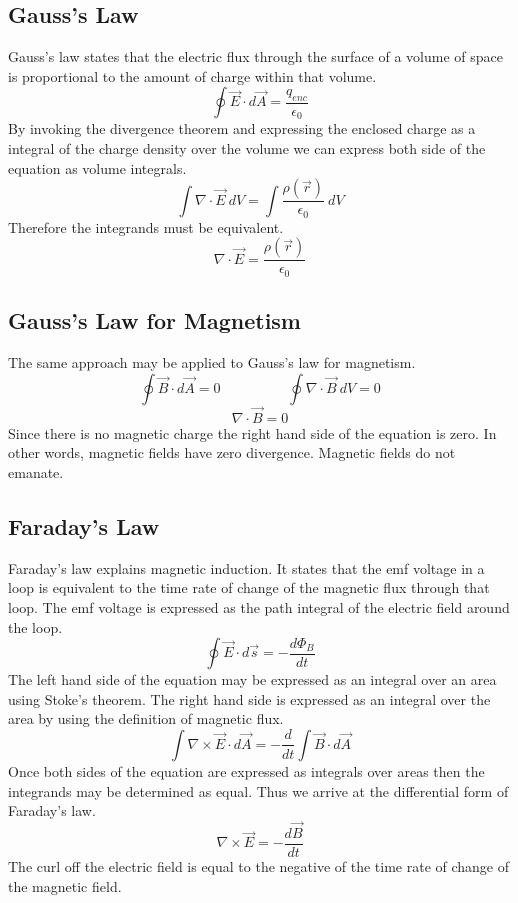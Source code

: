 \subsection{Gauss's Law}
Gauss's law states that the electric flux through the surface of a volume of space is proportional to the amount of charge within that volume.  
$$\oint\overrightarrow{E}\cdot d\overrightarrow{A}=\frac{q_{enc}}{\epsilon_0}$$
By invoking the divergence theorem and expressing the enclosed charge as a integral of the charge density over the volume we can express both side of the equation as volume integrals.
$$ \int \nabla \cdot \overrightarrow{E} \ dV=\int \frac{\rho(\overrightarrow{r})}{\epsilon_0} \ dV$$
Therefore the integrands must be equivalent.
$$\nabla \cdot \overrightarrow{E} =\frac{\rho(\overrightarrow{r})}{\epsilon_0}$$

\subsection{Gauss's Law for Magnetism}
The same approach may be applied to Gauss's law for magnetism.
$$\oint\overrightarrow{B}\cdot d\overrightarrow{A}=0 \hspace{2cm} \oint \nabla \cdot \overrightarrow{B} \ dV=0$$
$$\nabla \cdot \overrightarrow{B} =0$$
Since there is no magnetic charge the right hand side of the equation is zero.  In other words, magnetic fields have zero divergence.  Magnetic fields do not emanate.

\vspace{1cm}
\subsection{Faraday's Law}
Faraday's law explains magnetic induction.  It states that the emf voltage in a loop is equivalent to the time rate of change of the magnetic flux through that loop.  The emf voltage is expressed as the path integral of the electric field around the loop.
$$\oint\overrightarrow{E}\cdot d\overrightarrow{s}=-\frac{d\Phi_B}{dt} $$
The left hand side of the equation may be expressed as an integral over an area using Stoke's theorem.  The right hand side is expressed as an integral over the area by using the definition of magnetic flux.
$$ \int \nabla \times \overrightarrow{E} \cdot d\overrightarrow{A}=-\frac{d}{dt}\int \overrightarrow{B} \cdot d\overrightarrow{A}$$
Once both sides of the equation are expressed as integrals over areas then the integrands may be determined as equal.  Thus we arrive at the differential form of Faraday's law.
$$\nabla \times \overrightarrow{E} =  -\frac{d\overrightarrow{B}}{dt}  $$
The curl off the electric field is equal to the negative of the time rate of change of the magnetic field.


